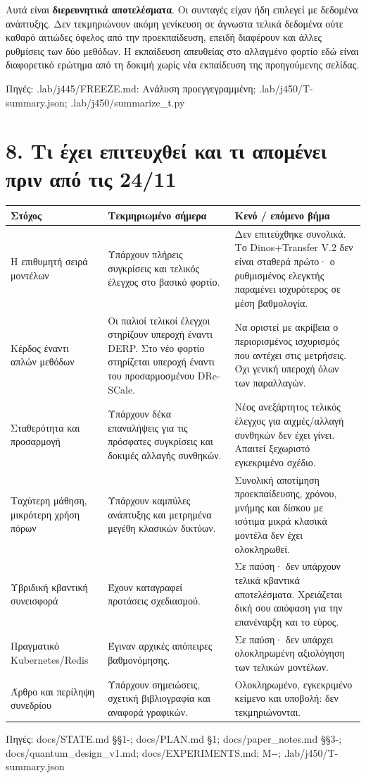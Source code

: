 \documentclass[10pt,a4paper]{article}
\newcommand{\src}[1]{\par{\scriptsize\color{gray}Πηγές: {\ttfamily #1}}\par}
\newcommand{\page}[1]{\clearpage\section*{#1}}
\begin{document}
Αυτά είναι \textbf{διερευνητικά αποτελέσματα}. Οι συνταγές είχαν ήδη επιλεγεί με δεδομένα ανάπτυξης. Δεν τεκμηριώνουν ακόμη γενίκευση σε άγνωστα τελικά δεδομένα ούτε καθαρό αιτιώδες όφελος από την προεκπαίδευση, επειδή διαφέρουν και άλλες ρυθμίσεις των δύο μεθόδων. Η εκπαίδευση απευθείας στο αλλαγμένο φορτίο εδώ είναι διαφορετικό ερώτημα από τη δοκιμή χωρίς νέα εκπαίδευση της προηγούμενης σελίδας.
\src{.lab/\allowbreak j445/\allowbreak FREEZE.md: Ανάλυση προεγγεγραμμένη; .lab/\allowbreak j450/\allowbreak T-\allowbreak summary.json; .lab/\allowbreak j450/\allowbreak summarize\_t.py}
\page{8. Τι έχει επιτευχθεί και τι απομένει πριν από τις 24/11}
\begin{tabular}{p{4.0cm}p{5.5cm}p{5.5cm}}\toprule
Στόχος & Τεκμηριωμένο σήμερα & Κενό / επόμενο βήμα\\\midrule
Η επιθυμητή σειρά μοντέλων & Υπάρχουν πλήρεις συγκρίσεις και τελικός έλεγχος στο βασικό φορτίο. & Δεν επιτεύχθηκε συνολικά. Το Dinos+Transfer V.2 δεν είναι σταθερά πρώτο· ο ρυθμισμένος ελεγκτής παραμένει ισχυρότερος σε μέση βαθμολογία.\\
Κέρδος έναντι απλών μεθόδων & Οι παλιοί τελικοί έλεγχοι στηρίζουν υπεροχή έναντι DERP. Στο νέο φορτίο στηρίζεται υπεροχή έναντι του προσαρμοσμένου DRe-SCale. & Να οριστεί με ακρίβεια ο περιορισμένος ισχυρισμός που αντέχει στις μετρήσεις. Όχι γενική υπεροχή όλων των παραλλαγών.\\
Σταθερότητα και προσαρμογή & Υπάρχουν δέκα επαναλήψεις για τις πρόσφατες συγκρίσεις και δοκιμές αλλαγής συνθηκών. & Νέος ανεξάρτητος τελικός έλεγχος για αιχμές/αλλαγή συνθηκών δεν έχει γίνει. Απαιτεί ξεχωριστό εγκεκριμένο σχέδιο.\\
Ταχύτερη μάθηση, μικρότερη χρήση πόρων & Υπάρχουν καμπύλες ανάπτυξης και μετρημένα μεγέθη κλασικών δικτύων. & Συνολική αποτίμηση προεκπαίδευσης, χρόνου, μνήμης και δίσκου με ισότιμα μικρά κλασικά μοντέλα δεν έχει ολοκληρωθεί.\\
Υβριδική κβαντική συνεισφορά & Έχουν καταγραφεί προτάσεις σχεδιασμού. & Σε παύση· δεν υπάρχουν τελικά κβαντικά αποτελέσματα. Χρειάζεται δική σου απόφαση για την επανέναρξη και το εύρος.\\
Πραγματικό Kubernetes/Redis & Έγιναν αρχικές απόπειρες βαθμονόμησης. & Σε παύση· δεν υπάρχει ολοκληρωμένη αξιολόγηση των τελικών μοντέλων.\\
Άρθρο και περίληψη συνεδρίου & Υπάρχουν σημειώσεις, σχετική βιβλιογραφία και αναφορά γραφικών. & Ολοκληρωμένο, εγκεκριμένο κείμενο και υποβολή: δεν τεκμηριώνονται.\\\bottomrule
\end{tabular}
\src{docs/\allowbreak STATE.md §§1-; docs/\allowbreak PLAN.md §1; docs/\allowbreak paper\_notes.md §§3-\allowbreak 7; docs/\allowbreak quantum\_design\_v1.md; docs/\allowbreak EXPERIMENTS.md; M-\allowbreak 20261109-\allowbreak 040; .lab/\allowbreak j450/\allowbreak T-\allowbreak summary.json}
\end{document}
